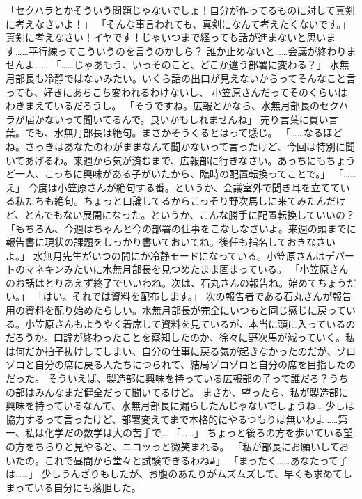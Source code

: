 「セクハラとかそういう問題じゃないでしょ！自分が作ってるものに対して真剣に考えなさいよ！」
「そんな事言われても、真剣になんて考えたくないです。」
真剣に考えなさい！イヤです！じゃいつまで経っても話が進まないと思います……平行線ってこういうのを言うのかしら？
誰か止めないと……会議が終わりませんよ……
「……じゃあもう、いっそのこと、どこか違う部署に変わる？」
水無月部長も冷静ではないみたい。いくら話の出口が見えないからってそんなこと言っても、好きにあちこち変われるわけないし、
小笠原さんだってそのくらいはわきまえているだろうし。
「そうですね。広報とかなら、水無月部長のセクハラが届かないって聞いてるんで。良いかもしれませんね」
売り言葉に買い言葉。でも、水無月部長は絶句。まさかそうくるとはって感じ。
「……なるほどね。さっきはあなたのわがままなんて聞かないって言ったけど、今回は特別に聞いてあげるわ。来週から気が済むまで、広報部に行きなさい。あっちにもちょうど一人、こっちに興味がある子がいたから、臨時の配置転換ってことで。」
「……え」
今度は小笠原さんが絶句する番。というか、会議室外で聞き耳を立てている私たちも絶句。ちょっと口論してるからこっそり野次馬しに来てみたんだけど、とんでもない展開になった。というか、こんな勝手に配置転換していいの？
「もちろん、今週はちゃんと今の部署の仕事をこなしなさいよ。来週の頭までに報告書に現状の課題をしっかり書いておいてね。後任も指名しておきなさいよ。」
水無月先生がいつの間にか冷静モードになっている。小笠原さんはデパートのマネキンみたいに水無月部長を見つめたまま固まっている。
「小笠原さんのお話はとりあえず終了でいいわね。次は、石丸さんの報告ね。始めてちょうだい。」
「はい。それでは資料を配布します。」
次の報告者である石丸さんが報告用の資料を配り始めたらしい。水無月部長が完全にいつもと同じ感じに戻っている。小笠原さんもようやく着席して資料を見ているが、本当に頭に入っているのだろうか。口論が終わったことを察知したのか、徐々に野次馬が減っていく。私は何だか拍子抜けしてしまい、自分の仕事に戻る気が起きなかったのだが、ゾロゾロと自分の席に戻る人たちにつられて、結局ゾロゾロと自分の席を目指したのだった。
そういえば、製造部に興味を持っている広報部の子って誰だろ？うちの部はみんなまだ健全だって聞いてるけど。
まさか、望ったら、私が製造部に興味を持っているなんて、水無月部長に漏らしたんじゃないでしょうね…
少しは協力するって言ったけど、部署変えてまで本格的にやるつもりは無いわよ……第一、私は化学だの数学は大の苦手で…
「……」
ちょっと後ろの方を歩いている望の方をちらりと見やると、ニコッっと微笑まれる。
「私が部長にお願いしておいたの。これで昼間から堂々と試験できるわね♪」
「まったく……あなたって子は……」
少しうんざりもしたが、お腹のあたりがムズムズして、早くも求めてしまっている自分にも落胆した。



